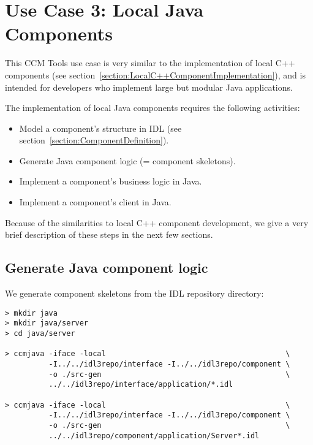 \section{Use Case 3: Local Java Components}
\label{section:LocalJavaComponentImplementation}

This CCM Tools use case is very similar to the implementation of local C++
components (see section~\ref{section:LocalC++ComponentImplementation}), and is
intended for developers who implement large but modular Java applications. 

\vspace{3mm}
The implementation of local Java components requires the following activities:
\begin{itemize}
	\item Model a component's structure in IDL 
			(see section~\ref{section:ComponentDefinition}). 
	\item Generate Java component logic (= component skeletons).
	\item Implement a component's business logic in Java.
	\item Implement a component's client in Java.
\end{itemize}

Because of the similarities to local C++ component development, we give a very
brief description of these steps in the next few sections.

\subsection{Generate Java component logic}
\label{subsection:GenerateJavaComponentLogic}

We generate component skeletons from the IDL repository directory:

\begin{verbatim}
> mkdir java
> mkdir java/server
> cd java/server
 
> ccmjava -iface -local                                         \
          -I../../idl3repo/interface -I../../idl3repo/component \ 
          -o ./src-gen                                          \
          ../../idl3repo/interface/application/*.idl

> ccmjava -iface -local                                         \
          -I../../idl3repo/interface -I../../idl3repo/component \
          -o ./src-gen                                          \
          ../../idl3repo/component/application/Server*.idl
\end{verbatim}

